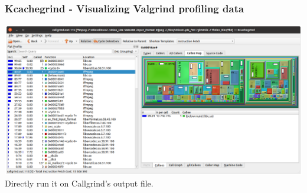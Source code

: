 \begin{frame}
  \frametitle{Kcachegrind - Visualizing Valgrind profiling data}
    \includegraphics[width=\textwidth]{common/kcachegrind.png}
    \small Directly run it on Callgrind's output file.
\end{frame}

